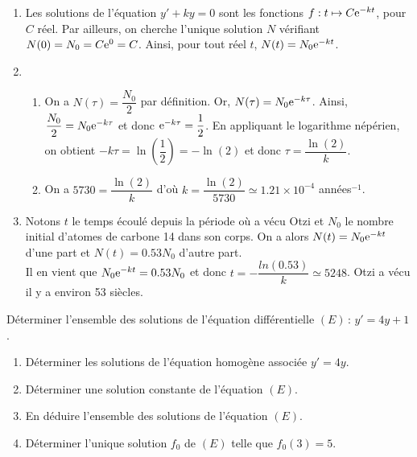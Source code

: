 \documentclass[11pt,fleqn, openany]{book} %
\begin{document}
\begin{solution}\hspace{0pt}
\begin{enumerate}
	\item Les solutions de l'équation \(y'+ky=0\) sont les fonctions \(f:t\mapsto C\mathrm{e}^{-kt}\), pour \(C\) réel. Par ailleurs, on cherche l'unique solution \(N\) vérifiant \(N(0)=N_0 = C\mathrm{e}^0=C\). Ainsi, pour tout réel \(t\), \(N(t)=N_0\mathrm{e}^{-kt}\).

\item 
	\begin{enumerate}
	\item On a \(N(\tau)=\dfrac{N_0}{2}\) par définition. Or, \(N(\tau)=N_0\mathrm{e}^{-k\tau}\). Ainsi, \(\dfrac{N_0}{2}=N_0\mathrm{e}^{-k\tau}\) et donc \(\mathrm{e}^{-k\tau}=\dfrac{1}{2}\). En appliquant le logarithme népérien, on obtient \(-k\tau=\ln\left(\dfrac{1}{2}\right)=-\ln (2)\) et donc \(\tau = \dfrac{\ln(2)}{k}\).
	\item On a \(5730=\dfrac{\ln(2)}{k}\) d'où \(k=\dfrac{\ln (2)}{5730}\simeq 1.21 \times 10^{-4}\) années$^{-1}$.
	
\end{enumerate}
	\item Notons \(t\) le temps écoulé depuis la période où a vécu Otzi et \(N_0\) le nombre initial d'atomes de carbone 14 dans son corps. On a alors \(N(t)=N_0\mathrm{e}^{-kt}\) d'une part et \(N(t)=0.53N_0\) d'autre part. \\Il en vient que \(N_0\mathrm{e}^{-kt}=0.53N_0\) et donc \(t=-\dfrac{ln(0.53)}{k}\simeq 5248\). Otzi a vécu il y a environ 53 siècles.
\end{enumerate}
\end{solution}




\begin{exercise}Déterminer l'ensemble des solutions de l'équation différentielle $(E)\,:\,y'=4y+1$. 
\begin{enumerate}
\item Déterminer les solutions de l'équation homogène associée $y'=4y$.
\item Déterminer une solution constante de l'équation $(E)$.
\item En déduire l'ensemble des solutions de l'équation $(E)$.
\item Déterminer l'unique solution $f_0$ de $(E)$ telle que $f_0(3)=5$.
\end{enumerate}\end{exercise}
\end{document}
